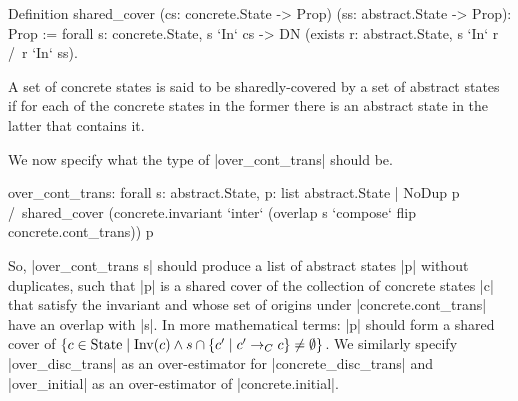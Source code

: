 \documentclass[runningheads]{llncs}
\newcommand{\State}{{\rm State}}
\newcommand{\Inv}{{\rm Inv}}
\newcommand{\contrans}{\rightarrow_C}
\begin{document}
\begin{code}
  Definition shared_cover
    (cs: concrete.State -> Prop) (ss: abstract.State -> Prop): Prop :=
        forall s: concrete.State, s `In` cs -> DN (exists r: abstract.State, s `In` r /\ r `In` ss).
\end{code}

A set of concrete states is said to be sharedly-covered
by a set of abstract states if for each of the concrete
states in the former there is an abstract state in the latter that
contains it.


We now specify what the type of |over_cont_trans| should be.
\begin{code}
over_cont_trans: forall s: abstract.State,
  { p: list abstract.State | NoDup p /\ shared_cover
    (concrete.invariant `inter` (overlap s `compose` flip concrete.cont_trans)) p }
\end{code}
So, |over_cont_trans s| should produce a list of abstract states |p|
without duplicates,
such that |p| is a shared cover of the collection
of concrete states |c| that satisfy the invariant and whose set of
origins under |concrete.cont_trans| have an overlap with |s|. In more
mathematical terms: |p| should form a shared cover of $\{ c \in \State
\mid \Inv(c) \wedge s\cap \{c' \mid c' \contrans c\} \neq \emptyset\}$.
We similarly specify |over_disc_trans| as an over-estimator for
|concrete_disc_trans| and |over_initial| as an over-estimator of
|concrete.initial|. 
\end{document}
